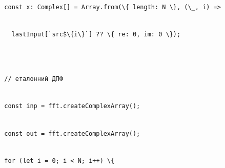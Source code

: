\documentclass[
]{article}
\newcommand{\passthrough}[1]{#1}
\begin{document}
\passthrough{\lstinline!  !}\passthrough{\lstinline!const!}\passthrough{\lstinline! !}\passthrough{\lstinline!x:!}\passthrough{\lstinline! !}\passthrough{\lstinline!Complex[]!}\passthrough{\lstinline! !}\passthrough{\lstinline!=!}\passthrough{\lstinline! !}\passthrough{\lstinline!Array.from!}\passthrough{\lstinline!(\{!}\passthrough{\lstinline! !}\passthrough{\lstinline!length:!}\passthrough{\lstinline! !}\passthrough{\lstinline!N!}\passthrough{\lstinline! !}\passthrough{\lstinline!\},!}\passthrough{\lstinline! !}\passthrough{\lstinline!(\_,!}\passthrough{\lstinline! !}\passthrough{\lstinline!i)!}\passthrough{\lstinline! !}\passthrough{\lstinline!=>!}\strut \\
\passthrough{\lstinline!    !}\passthrough{\lstinline!lastInput!}\passthrough{\lstinline![`!}\passthrough{\lstinline!src!}\passthrough{\lstinline!$\{i\}`]!}\passthrough{\lstinline! !}\passthrough{\lstinline!??!}\passthrough{\lstinline! !}\passthrough{\lstinline!\{!}\passthrough{\lstinline! !}\passthrough{\lstinline!re:!}\passthrough{\lstinline! !}\passthrough{\lstinline!0,!}\passthrough{\lstinline! !}\passthrough{\lstinline!im:!}\passthrough{\lstinline! !}\passthrough{\lstinline!0!}\passthrough{\lstinline! !}\passthrough{\lstinline!\});!}\strut \\
\strut \\
\passthrough{\lstinline!  !}\passthrough{\lstinline!//!}\passthrough{\lstinline! !}\passthrough{\lstinline!еталонний!}\passthrough{\lstinline! !}\passthrough{\lstinline!ДПФ!}\strut \\
\passthrough{\lstinline!  !}\passthrough{\lstinline!const!}\passthrough{\lstinline! !}\passthrough{\lstinline!inp!}\passthrough{\lstinline! !}\passthrough{\lstinline!=!}\passthrough{\lstinline! !}\passthrough{\lstinline!fft.createComplexArray!}\passthrough{\lstinline!();!}\strut \\
\passthrough{\lstinline!  !}\passthrough{\lstinline!const!}\passthrough{\lstinline! !}\passthrough{\lstinline!out!}\passthrough{\lstinline! !}\passthrough{\lstinline!=!}\passthrough{\lstinline! !}\passthrough{\lstinline!fft.createComplexArray!}\passthrough{\lstinline!();!}\strut \\
\passthrough{\lstinline!  !}\passthrough{\lstinline!for!}\passthrough{\lstinline! !}\passthrough{\lstinline!(let!}\passthrough{\lstinline! !}\passthrough{\lstinline!i!}\passthrough{\lstinline! !}\passthrough{\lstinline!=!}\passthrough{\lstinline! !}\passthrough{\lstinline!0;!}\passthrough{\lstinline! !}\passthrough{\lstinline!i!}\passthrough{\lstinline! !}\passthrough{\lstinline!<!}\passthrough{\lstinline! !}\passthrough{\lstinline!N;!}\passthrough{\lstinline! !}\passthrough{\lstinline!i++)!}\passthrough{\lstinline! !}\passthrough{\lstinline!\{!}\strut \\
\end{document}
